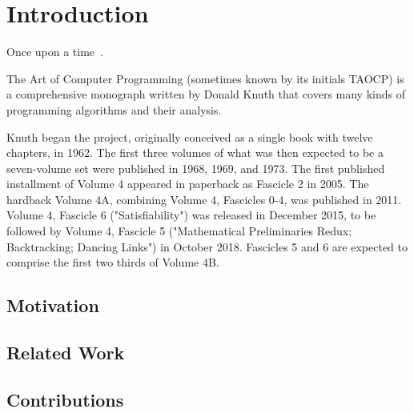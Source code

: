 \chapter{Introduction}
\minitoc
\vspace*{1cm}

Once upon a time~\cite{cpp-recovery}.

The Art of Computer Programming (sometimes known by its initials TAOCP) is a
comprehensive monograph written by Donald Knuth that covers many kinds of
programming algorithms and their analysis.

Knuth began the project, originally conceived as a single book with twelve
chapters, in 1962. The first three volumes of what was then expected to be a
seven-volume set were published in 1968, 1969, and 1973. The first published
installment of Volume 4 appeared in paperback as Fascicle 2 in 2005. The
hardback Volume 4A, combining Volume 4, Fascicles 0-4, was published in 2011.
Volume 4, Fascicle 6 ("Satisfiability") was released in December 2015, to be
followed by Volume 4, Fascicle 5 ("Mathematical Preliminaries Redux;
Backtracking; Dancing Links") in October 2018. Fascicles 5 and 6 are expected
to comprise the first two thirds of Volume 4B.


\section{Motivation}

\section{Related Work}

\section{Contributions}
